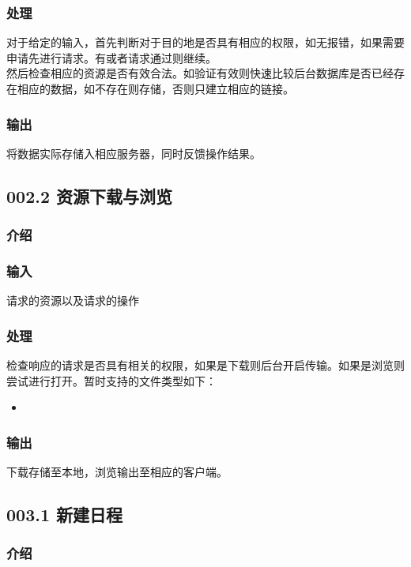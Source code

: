     \subsubsection{处理}
    对于给定的输入，首先判断对于目的地是否具有相应的权限，如无报错，如果需要申请先进行请求。有或者请求通过则继续。\\
    然后检查相应的资源是否有效合法。如验证有效则快速比较后台数据库是否已经存在相应的数据，如不存在则存储，否则只建立相应的链接。\\

    \subsubsection{输出}
    将数据实际存储入相应服务器，同时反馈操作结果。

  \subsection{002.2 资源下载与浏览}
    \subsubsection{介绍}

    \subsubsection{输入}
    请求的资源以及请求的操作
    \subsubsection{处理}
    检查响应的请求是否具有相关的权限，如果是下载则后台开启传输。如果是浏览则尝试进行打开。暂时支持的文件类型如下：
    \begin{itemize}
      \item
    \end{itemize}
    \subsubsection{输出}
    下载存储至本地，浏览输出至相应的客户端。

  \subsection{003.1 新建日程}
    \subsubsection{介绍}

